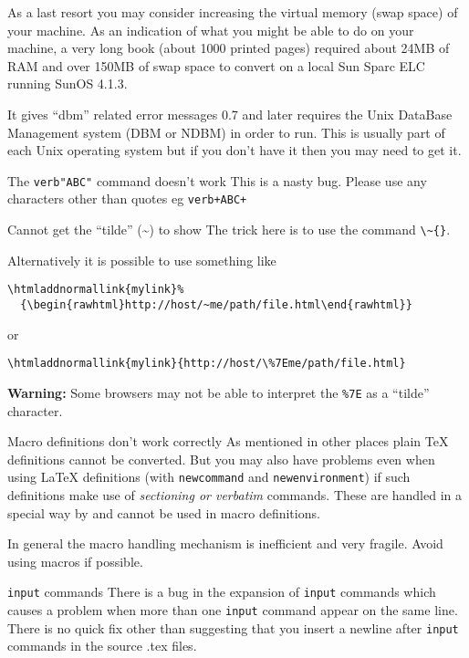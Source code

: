 \begin{htmllist}
As a last resort you may consider increasing the virtual memory
(swap space) of your machine. As an indication 
of what you might be able to do on your machine,
a very long book (about 1000 printed pages) required about 
24MB of RAM and over 150MB of swap space to convert on a local Sun Sparc ELC
running SunOS 4.1.3.

\item [It gives ``dbm'' related error messages]
\latextohtml{} 0.7 and later requires the
Unix DataBase Management system (DBM or NDBM) in order to run.
This is usually part of each Unix operating system but if you 
don't have it then you may need to get it.

\item [The \texttt{verb"ABC"} command doesn't work]
This is a nasty bug. Please use any characters other than quotes eg
\texttt{verb+ABC+}

\item [Cannot get the ``tilde'' (\~{}) to show]
The trick here is to use the command \verb|\~{}|. 

Alternatively it is possible to use something like \\
\begin{verbatim}
\htmladdnormallink{mylink}%
  {\begin{rawhtml}http://host/~me/path/file.html\end{rawhtml}}
\end{verbatim}

or

\verb|\htmladdnormallink{mylink}{http://host/\%7Eme/path/file.html}| 

\textbf{Warning:} Some browsers may not be able to interpret the \verb|%7E|
as a ``tilde'' character.

\item [Macro definitions don't work correctly]
As mentioned in other places plain TeX definitions cannot be
converted.
But you may also have problems even when using LaTeX definitions
(with \texttt{newcommand} and \texttt{newenvironment}) if such definitions
make use of {\it sectioning or verbatim} commands. These are 
handled in a special way by \latextohtml{} and cannot be used in
macro definitions. 

In general the macro handling mechanism is inefficient and very
fragile. Avoid using macros if possible.

\item [\texttt{input} commands]
There is a bug in the expansion of \texttt{input} commands which causes a problem
when more than one \texttt{input} command appear on the same line.
There is no quick fix other than suggesting that you 
insert a newline after \texttt{input} commands in the source .tex files.


\end{htmllist}
